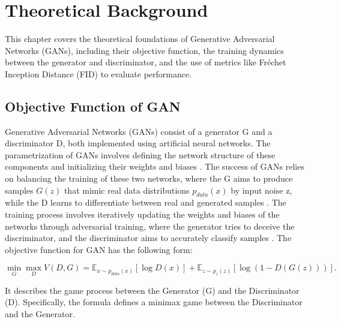 \chapter{Theoretical Background}
\label{Theoretical Background for GAN}
This chapter covers the theoretical foundations of Generative Adversarial Networks (GANs),
including their objective function, the training dynamics between the generator and discriminator, 
and the use of metrics like Fréchet Inception Distance (FID) to evaluate performance. 



\section{Objective Function of GAN}

Generative Adversarial Networks (GANs) consist of a generator G and a discriminator D, 
both implemented using artificial neural networks. The parametrization of GANs involves 
defining the network structure of these components and initializing their weights and biases \citep{10.1007/s10928-021-09787-4}. 
The success of GANs relies on balancing the training of these two networks, where the 
G aims to produce samples $G(z)$ that mimic real data distributions $p_{data}(x)$ by input noise z, while the D 
learns to differentiate between real and generated samples \citep{10.1109/taslp.2017.2761547}. 
The training process involves iteratively updating the weights and biases of the networks through 
adversarial training, where the generator tries to deceive the discriminator, and the discriminator 
aims to accurately classify samples \citep{10.48550/arxiv.1802.05637}.
The objective function for GAN has the following form:


\begin{equation}
    \label{eq:min & max}
    \min_{G} \max_{D} V(D, G) = \mathbb{E}_{x \sim p_{data}(x)} [\log D(x)] + \mathbb{E}_{z \sim p_{z}(z)} [\log(1 - D(G(z)))].
\end{equation}



It describes the game process between the Generator (G) and the Discriminator (D). Specifically, 
the formula defines a minimax game between the Discriminator and the Generator.


